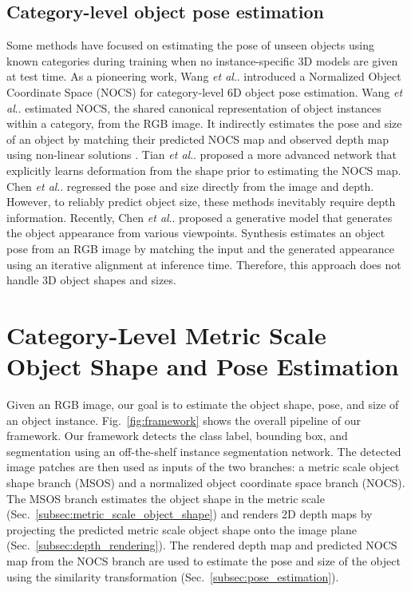 \documentclass[letterpaper, 10 pt, journal, twoside]{IEEEtran}
\makeatletter
\DeclareRobustCommand\onedot{\futurelet\@let@token\@onedot}
\def\@onedot{\ifx\@let@token.\else.\null\fi\xspace}
\def\etal{\emph{et al}\onedot}
\newcommand{\figref}[1]{Fig.~\ref{#1}}
\newcommand{\secref}[1]{Sec.~\ref{#1}}
\makeatother
\begin{document}
\subsection{Category-level object pose estimation}
Some methods have focused on estimating the pose of unseen objects using known categories during training when no instance-specific 3D models are given at test time. 
As a pioneering work, Wang \etal \cite{wang2019normalized} introduced a Normalized Object Coordinate Space (NOCS) for category-level 6D object pose estimation. 
Wang \etal estimated NOCS, the shared canonical representation of object instances within a category, from the RGB image.
It indirectly estimates the pose and size of an object by matching their predicted NOCS map and observed depth map using non-linear solutions \cite{umeyama1991least}.
Tian \etal \cite{Tian2020prior} proposed a more advanced network that explicitly learns deformation from the shape prior to estimating the NOCS map.
Chen \etal \cite{chen2020cass} regressed the pose and size directly from the image and depth.
However, to reliably predict object size, these methods inevitably require depth information.
Recently, Chen \etal \cite{chen2020Synthesis} proposed a generative model that generates the object appearance from various viewpoints.
Synthesis \cite{chen2020Synthesis} estimates an object pose from an RGB image by matching the input and the generated appearance using an iterative alignment at inference time.
Therefore, this approach does not handle 3D object shapes and sizes.






\section{Category-Level Metric Scale Object Shape and Pose Estimation}
Given an RGB image, our goal is to estimate the object shape, pose, and size of an object instance.
\figref{fig:framework} shows the overall pipeline of our framework.
Our framework detects the class label, bounding box, and segmentation using an off-the-shelf instance segmentation network.
The detected image patches are then used as inputs of the two branches: a metric scale object shape branch (MSOS) and a normalized object coordinate space branch (NOCS).
The MSOS branch estimates the object shape in the metric scale (\secref{subsec:metric_scale_object_shape}) and renders 2D depth maps by projecting the predicted metric scale object shape onto the image plane (\secref{subsec:depth_rendering}).
The rendered depth map and predicted NOCS map from the NOCS branch are used to estimate the pose and size of the object using the similarity transformation (\secref{subsec:pose_estimation}).
\end{document}
